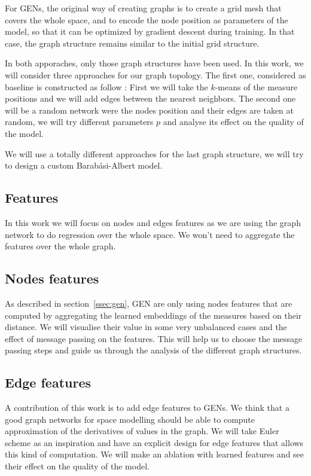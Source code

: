 \documentclass[a4paper,10pt]{article}
\newcommand{\ap}[1]{\marginpar{{\tiny \color{red} [AP] #1}}}
\begin{document}
\ap{TODO : graph}

For GENs, the original way of creating graphs is to create a grid mesh that covers the whole space, and to encode the node position as parameters of the model, so that it can be optimized by gradient descent during training. In that case, the graph structure remains similar to the initial grid structure.

\ap{TODO : graph}

In both apporaches, only those graph structures have been used. In this work, we will consider three approaches for our graph topology. The first one, considered as baseline is constructed as follow : First we will take the $k$-means of the measure positions and we will add edges between the nearest neighbors. The second one will be a random network were the nodes position and their edges are taken at random, we will try different parameters $p$ and analyse its effect on the quality of the model.

We will use a totally different approaches for the last graph structure, we will try to design a custom Barab\'asi-Albert model.
\ap{TODO : graph}


\subsection{Features}

In this work we will focus on nodes and edges features as we are using the graph network to do regression over the whole space. We won't need to aggregate the features over the whole graph.

\subsection{Nodes features}
As described in section~\ref{ssec:gen}, GEN are only using nodes features that are computed by aggregating the learned embeddings of the measures based on their distance. We will visualise their value in some very unbalanced cases and the effect of message passing on the features. This will help us to choose the message passing steps and guide us through the analysis of the different graph structures.

\subsection{Edge features}
A contribution of this work is to add edge features to GENs. We think that a good graph networks for space modelling should be able to compute approximation of the derivatives of values in the graph. We will take Euler scheme as an inspiration and have an explicit design for edge features that allows this kind of computation. We will make an ablation with learned features and see their effect on the quality of the model.
\ap{TODO: sketch}
\end{document}
